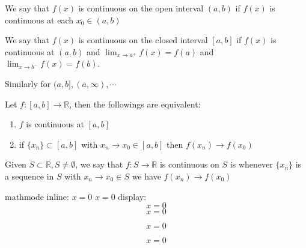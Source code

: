 \begin{defn}
    We say that $f(x)$ is continuous on the open interval $(a,b)$ if $f(x)$ is continuous at each $x_0\in (a,b)$
    
    We say that $f(x)$ is continuous on the closed interval $[a,b]$ if $f(x)$ is continuous at $(a,b)$ and $\lim_{x\to a^+} f(x) = f(a)$ and $\lim_{x\to b^-} f(x) = f(b)$.
    
    Similarly for $(a,b],(a,\infty),\cdots$
\end{defn}

\begin{thm}
Let $f\colon [a,b] \to \mathbb{R}$, then the followings are equivalent:
\begin{enumerate}
\item $f$ is continuous at $[a,b]$
\item if $\{x_n\}\subset [a,b]$ with $x_n\to x_0\in[a,b]$ then $f(x_n) \to f(x_0)$
\end{enumerate}
\end{thm}

\begin{rem}
Given $S\subset \mathbb{R}, S\neq \emptyset$, we say that $f\colon S\to \mathbb{R}$ is continuous on $S$ is whenever $\{x_n\}$ is a sequence in $S$ with $x_n\to x_0\in S$ we have $f(x_n) \to f(x_0)$
\end{rem}



mathmode
inline: $x=0$ \(x=0\)
display: $$x=0$$ \[x=0\] 

\begin{equation*}
    x=0
\end{equation*}

\begin{equation}
    x=0
\end{equation} 

